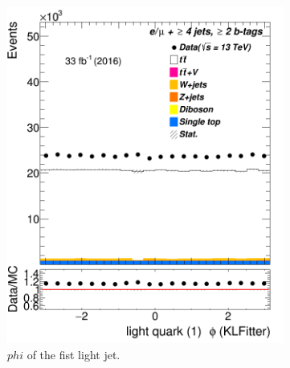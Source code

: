 \begin{figure}
	\medskip
	\begin{subfigure}{0.35\textwidth}
		\includegraphics[width=\linewidth]{ControlPlots_emujets_2016_4incl_2incl/klf_lq1_phi_emujets_2016.png}
		\caption{$phi$ of the fist light jet.} \label{fig:klf10}
	\end{subfigure}
	\hspace*{1.5cm}
	\begin{subfigure}{0.35\textwidth}

\end{subfigure}
\end{figure}

